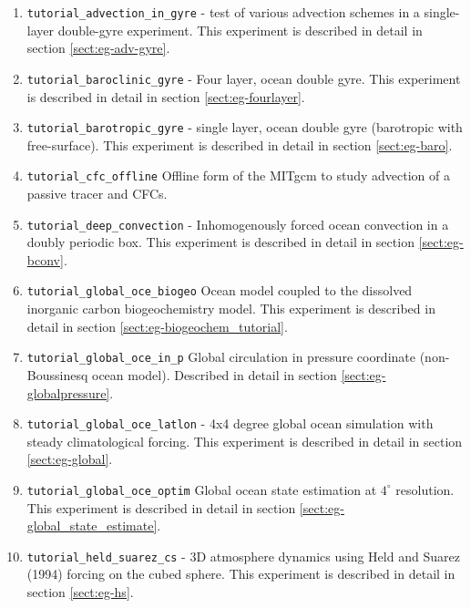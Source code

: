 \begin{enumerate}
  
\item \texttt{tutorial_advection\_in\_gyre} - test of various
  advection schemes in a single-layer double-gyre experiment.
  This experiment is described in detail in section
  \ref{sect:eg-adv-gyre}.

\item \texttt{tutorial\_baroclinic\_gyre} - Four layer, ocean double
  gyre. This experiment is described in detail in section
  \ref{sect:eg-fourlayer}.

\item \texttt{tutorial\_barotropic\_gyre} - single layer, ocean double
  gyre (barotropic with free-surface). This experiment is described in
  detail in section \ref{sect:eg-baro}.

\item \texttt{tutorial\_cfc\_offline} Offline form of the MITgcm to
  study advection of a passive tracer and CFCs.

\item \texttt{tutorial\_deep\_convection} - Inhomogenously forced
  ocean convection in a doubly periodic box. This experiment is
  described in detail in section \ref{sect:eg-bconv}.

\item \texttt{tutorial\_global\_oce\_biogeo} Ocean model coupled to
  the dissolved inorganic carbon biogeochemistry model. This
  experiment is described in detail in section
  \ref{sect:eg-biogeochem_tutorial}.

\item \texttt{tutorial\_global\_oce\_in\_p} Global circulation in
  pressure coordinate (non-Boussinesq ocean model). Described in
  detail in section \ref{sect:eg-globalpressure}.

\item \texttt{tutorial\_global\_oce\_latlon} - 4x4 degree global ocean
  simulation with steady climatological forcing. This experiment is
  described in detail in section \ref{sect:eg-global}.

\item \texttt{tutorial\_global\_oce\_optim} Global ocean state
  estimation at $4^\circ$ resolution.  This experiment is described in
  detail in section \ref{sect:eg-global_state_estimate}.

\item \texttt{tutorial\_held\_suarez\_cs} - 3D atmosphere dynamics
  using Held and Suarez (1994) forcing on the cubed sphere.  This
  experiment is described in detail in section \ref{sect:eg-hs}.
  

\end{enumerate}
